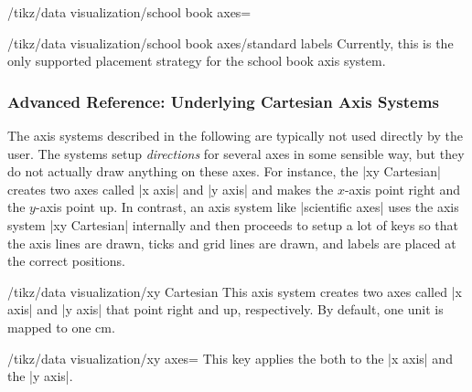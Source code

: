 \begin{key}{/tikz/data visualization/school book axes=}
\begin{key}{/tikz/data visualization/school book axes/standard labels}
    Currently, this is the only supported placement strategy for the
    school book axis system.
\begin{codeexample}[]
\end{codeexample}
  \end{key}
\end{key}



\subsubsection{Advanced Reference: Underlying Cartesian Axis Systems}

The axis systems described in the following are typically not used
directly by the user. The systems setup \emph{directions} for several
axes in some sensible way, but they do not actually draw anything on
these axes. For instance, the |xy Cartesian| creates two axes called
|x axis| and |y axis| and makes the $x$-axis point right and the
$y$-axis point up. In contrast, an axis system like |scientific axes|
uses the axis system |xy Cartesian| internally and then proceeds to
setup a lot of keys so that the axis lines are drawn,
ticks and grid lines are drawn, and labels are placed at the correct
positions.

\begin{key}{/tikz/data visualization/xy Cartesian}
  This axis system creates two axes called |x axis| and |y axis| that
  point right and up, respectively. By default, one unit is mapped to
  one cm.

\begin{codeexample}[]
\end{codeexample}


  \begin{key}{/tikz/data visualization/xy axes=}
    This key applies the  both to the |x axis| and the
    |y axis|.
  \end{key}

\end{key}


